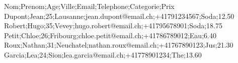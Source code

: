 Nom;Prenom;Age;Ville;Email;Telephone;Categorie;Prix
Dupont;Jean;25;Lausanne;jean.dupont@email.ch;+41791234567;Soda;12.50
Robert;Hugo;35;Vevey;hugo.robert@email.ch;+41795678901;Soda;18.75
Petit;Chloe;26;Fribourg;chloe.petit@email.ch;+41786789012;Eau;6.40
Roux;Nathan;31;Neuchatel;nathan.roux@email.ch;+41767890123;Jus;21.30
Garcia;Lea;24;Sion;lea.garcia@email.ch;+41778901234;The;13.60
